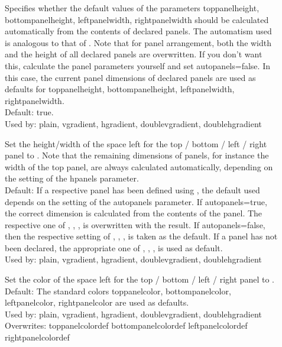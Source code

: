 \begin{slide}
\begin{description}
 \item[]
    Specifies whether the default values of the parameters toppanelheight,
    bottompanelheight, leftpanelwidth, rightpanelwidth should be calculated
    automatically from the contents of declared panels. The automatism used
    is analogous to that of . Note that for panel
    arrangement, both the width and the height of all declared panels are
    overwritten. If you don't want this, calculate the panel parameters
    yourself and set autopanels=false. In this case, the current panel
    dimensions of declared panels are used as defaults for toppanelheight,
    bottompanelheight, leftpanelwidth, rightpanelwidth.\\
    Default: true.\\
    Used by: plain, vgradient, hgradient, doublevgradient, doublehgradient

 \item[]
    Set the height/width of the space left for the top / bottom / left / right
    panel to . Note that the remaining dimensions of panels, for
    instance the width of the top panel, are always calculated automatically,
    depending on the setting of the hpanels parameter.\\
    Default: If a respective panel has been defined using
      , the default used depends on the setting of the
      autopanels parameter. If autopanels=true, the correct dimension is
      calculated from the contents of the panel. The respective one of
      , ,
      ,  is overwritten
      with the result. If autopanels=false, then the respective setting of
      , ,
      ,  is taken as the
      default. If a panel has not been declared, the appropriate one of
      , ,
      ,  is used
      as default. \\
    Used by: plain, vgradient, hgradient, doublevgradient, doublehgradient

 \item[]
    Set the color of the space left for the top / bottom / left / right panel
    to .\\
    Default: The standard colors toppanelcolor, bottompanelcolor, leftpanelcolor,
      rightpanelcolor are used as defaults.\\
    Used by: plain, vgradient, hgradient, doublevgradient, doublehgradient\\
    Overwrites: toppanelcolordef bottompanelcolordef leftpanelcolordef
    rightpanelcolordef


\end{description}
\end{slide}

